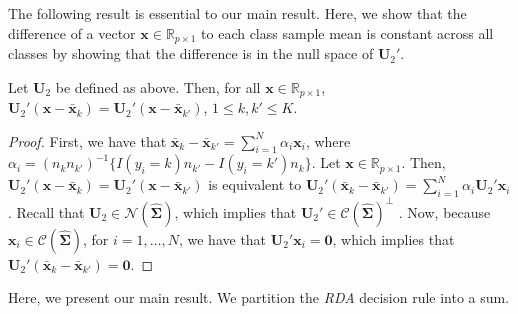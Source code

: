 \documentclass[11pt]{article}
\newcommand{\xbar}{\bar{\bm x}}
\begin{document}
The following result is essential to our main result. Here, we show that the difference of a vector $\bm x \in \mathbb{R}_{p \times 1}$ to each class sample mean is constant across all classes by showing that the difference is in the null space of $\bm U_2'$.

\begin{lemma}\label{lemma:RDA-constant-term}
Let $\bm U_2$ be defined as above. Then, for all $\bm x \in \mathbb{R}_{p \times 1}$, $\bm U_2' (\bm x - \xbar_k) = \bm U_2' (\bm x - \xbar_{k'})$, $1 \le k, k' \le K$.
\end{lemma}
\begin{proof}
	First, we have that $\xbar_k - \xbar_{k'} = \sum_{i=1}^N \alpha_i \bm x_i$, where $\alpha_i = (n_k n_{k'})^{-1} \{ I(y_i = k) n_{k'} - I(y_i = k') n_k \}$. Let $\bm x \in \mathbb{R}_{p \times 1}$. Then, $\bm U_2' (\bm x - \xbar_k) = \bm U_2' (\bm x - \xbar_{k'})$ is equivalent to $\bm U_2'(\xbar_k - \xbar_{k'}) = \sum_{i=1}^N \alpha_i \bm U_2' \bm x_i$. Recall that $\bm U_2 \in \mathcal{N}(\widehat{\bm \Sigma})$, which implies that $\bm U_2' \in \mathcal{C}(\widehat{\bm \Sigma})^{\perp}$ \citep[Lemma 1.2.5]{Kollo:2005vp}. Now, because $\bm x_i \in \mathcal{C}(\widehat{\bm \Sigma})$, for $i = 1, \ldots, N$, we have that $\bm U_2' \bm x_i = \bm 0$, which implies that $\bm U_2'(\xbar_k - \xbar_{k'}) = \bm 0$.
\end{proof}

Here, we present our main result. We partition the \emph{RDA} decision rule into a sum.
\end{document}
